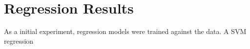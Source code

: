 \section{Regression Results}
As a initial experiment, regression models were trained against the data.
A SVM regression
